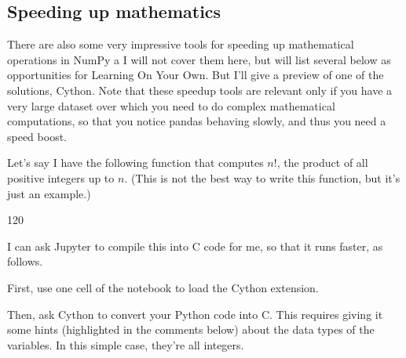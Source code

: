 \documentclass[letterpaper,10pt,english]{jupyterBook}
\begin{document}
\subsection{Speeding up mathematics}
\label{\detokenize{chapter-11-processing-rows:speeding-up-mathematics}}
\sphinxAtStartPar
There are also some very impressive tools for speeding up mathematical operations in NumPy a   I will not cover them here, but will list several below as opportunities for Learning On Your Own.  But I’ll give a preview of one of the solutions, Cython.  Note that these speedup tools are relevant only if you have a very large dataset over which you need to do complex mathematical computations, so that you notice pandas behaving slowly, and thus you need a speed boost.

\sphinxAtStartPar
Let’s say I have the following function that computes \(n!\), the product of all positive integers up to \(n\).  (This is not the best way to write this function, but it’s just an example.)

\begin{sphinxVerbatim}[commandchars=\\\{\}]
    
      
          
          
     

  
\end{sphinxVerbatim}

\begin{sphinxVerbatim}[commandchars=\\\{\}]
120
\end{sphinxVerbatim}

\sphinxAtStartPar
I can ask Jupyter to compile this into C code for me, so that it runs faster, as follows.

\sphinxAtStartPar
First, use one cell of the notebook to load the Cython extension.

\begin{sphinxVerbatim}[commandchars=\\\{\}]
 
\end{sphinxVerbatim}

\sphinxAtStartPar
Then, ask Cython to convert your Python code into C.  This requires giving it some hints (highlighted in the comments below) about the data types of the variables.  In this simple case, they’re all integers.
\end{document}
